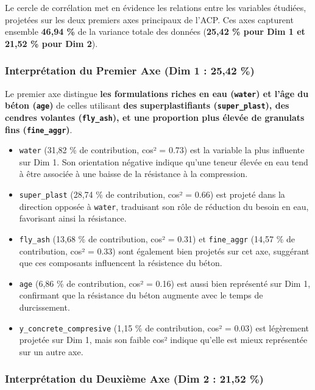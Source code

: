 \documentclass[
  12pt,
]{article}
\providecommand{\tightlist}{%
  \setlength{\itemsep}{0pt}\setlength{\parskip}{0pt}}
\begin{document}
Le cercle de corrélation met en évidence les relations entre les
variables étudiées, projetées sur les deux premiers axes principaux de
l'ACP. Ces axes capturent ensemble \textbf{46,94 \%} de la variance
totale des données (\textbf{25,42 \% pour Dim 1 et 21,52 \% pour Dim
2}).

\subsubsection{Interprétation du Premier Axe (Dim 1 : 25,42
\%)}\label{interpruxe9tation-du-premier-axe-dim-1-2542}

Le premier axe distingue \textbf{les formulations riches en eau
(\texttt{water}) et l'âge du béton (\texttt{age})} de celles utilisant
\textbf{des superplastifiants (\texttt{super\_plast}), des cendres
volantes (\texttt{fly\_ash}), et une proportion plus élevée de granulats
fins (\texttt{fine\_aggr})}.

\begin{itemize}
\tightlist
\item
  \texttt{water} (31,82 \% de contribution, cos² = 0.73) est la variable
  la plus influente sur Dim 1. Son orientation négative indique qu'une
  teneur élevée en eau tend à être associée à une baisse de la
  résistance à la compression.
\item
  \texttt{super\_plast} (28,74 \% de contribution, cos² = 0.66) est
  projeté dans la direction opposée à \texttt{water}, traduisant son
  rôle de réduction du besoin en eau, favorisant ainsi la résistance.
\item
  \texttt{fly\_ash} (13,68 \% de contribution, cos² = 0.31) et
  \texttt{fine\_aggr} (14,57 \% de contribution, cos² = 0.33) sont
  également bien projetés sur cet axe, suggérant que ces composants
  influencent la résistence du béton.
\item
  \texttt{age} (6,86 \% de contribution, cos² = 0.16) est aussi bien
  représenté sur Dim 1, confirmant que la résistance du béton augmente
  avec le temps de durcissement.
\item
  \texttt{y\_concrete\_compresive} (1,15 \% de contribution, cos² =
  0.03) est légèrement projetée sur Dim 1, mais son faible cos² indique
  qu'elle est mieux représentée sur un autre axe.
\end{itemize}

\subsubsection{Interprétation du Deuxième Axe (Dim 2 : 21,52
\%)}\label{interpruxe9tation-du-deuxiuxe8me-axe-dim-2-2152}
\end{document}
